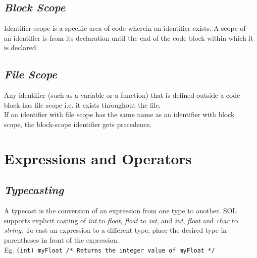     \subsection{\textit{Block Scope}}
    Identifier scope is a specific area of code wherein an identifier exists. A scope of an identifier is from its declaration until the end of the code block within which it is declared.
    
    \subsection{\textit{File Scope}}
    Any identifier (such as a variable or a function) that is defined outside a code block has file scope i.e. it exists throughout the file.\\
    If an identifier with file scope has the same name as an identifier with block scope, the block-scope identifier gets precedence.

\section{Expressions and Operators}
    \subsection{\textit{Typecasting}}
    A typecast is the conversion of an expression from one type to another. SOL supports explicit casting of \textit{int} to \textit{float}, \textit{float} to \textit{int}, and \textit{int}, \textit{float} and \textit{char} to \textit{string}. To cast an expression to a different type, place the desired type in parentheses in front of the expression. \\
    Eg: \texttt{(int) myFloat /* Returns the integer value of myFloat */}
    
